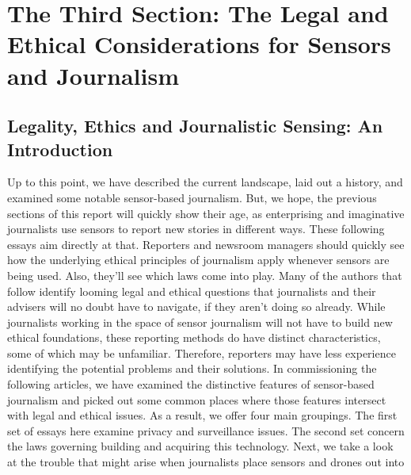 \chapter{The Third Section: The Legal and Ethical Considerations for Sensors and Journalism}


\section{Legality, Ethics and Journalistic Sensing: An Introduction}
Up to this point, we have described the current landscape, laid out a history,
and examined some notable sensor-based journalism. But, we hope,
the previous sections of this report will quickly show their age, as enterprising
and imaginative journalists use sensors to report new stories in different
ways. These following essays aim directly at that.
Reporters and newsroom managers should quickly see how the underlying
ethical principles of journalism apply whenever sensors are being used.
Also, they'll see which laws come into play. Many of the authors that follow
identify looming legal and ethical questions that journalists and their advisers
will no doubt have to navigate, if they aren't doing so already.
While journalists working in the space of sensor journalism will not have
to build new ethical foundations, these reporting methods do have distinct
characteristics, some of which may be unfamiliar. Therefore, reporters may
have less experience identifying the potential problems and their solutions.
In commissioning the following articles, we have examined the distinctive
features of sensor-based journalism and picked out some common places
where those features intersect with legal and ethical issues.
As a result, we offer four main groupings. The first set of essays here examine
privacy and surveillance issues. The second set concern the laws governing
building and acquiring this technology. Next, we take a look at the
trouble that might arise when journalists place sensors and drones out into

